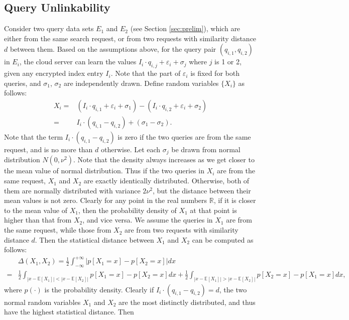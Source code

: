 \documentclass{article}
\begin{document}
\subsection{Query Unlinkability}
Consider two query data sets $E_1$ and $E_2$ (see Section \ref{sec:prelim}), which are either from the same search request, or from two requests with similarity distance $d$ between them. Based on the assumptions above, for the query pair $(q_{i,1},q_{i,2})$ in $E_i$, the cloud server can learn the values $I_i\cdot q_{i,j}+\varepsilon_i+\sigma_j$ where $j$ is 1 or 2, given any encrypted index entry $I_i$. Note that the part of $\varepsilon_i$ is fixed for both queries, and $\sigma_1$, $\sigma_2$ are independently drawn. Define random variables $\{X_i\}$ as follows:
$$
\begin{aligned}
X_i = &(I_i\cdot q_{i,1}+\varepsilon_i+\sigma_1) - (I_i\cdot q_{i,2}+\varepsilon_i+\sigma_2)\\
=&I_i\cdot(q_{i,1}-q_{i,2})+(\sigma_1-\sigma_2).
\end{aligned}
$$
Note that the term $I_i\cdot(q_{i,1}-q_{i,2})$ is zero if the two queries are from the same request, and is no more than $d$ otherwise. Let each $\sigma_j$ be drawn from normal distribution $N(0,\nu^2)$. Note that the density always increases as we get closer to the mean value of normal distribution. Thus if the two queries in $X_i$ are from the same request, $X_1$ and $X_2$ are exactly identically distributed. Otherwise, both of them are normally distributed with variance $2\nu^2$, but the distance between their mean values is not zero. Clearly for any point in the real numbers $\mathbb{R}$, if it is closer to the mean value of $X_1$, then the probability density of $X_1$ at that point is higher than that from $X_2$, and vice versa. We assume the queries in $X_1$ are from the same request, while those from $X_2$ are from two requests with similarity distance $d$. Then the statistical distance between $X_1$ and $X_2$ can be computed as follows:
\newcommand{\norm}[1]{| #1 |}
$$\begin{aligned}
&\Delta(X_1, X_2) 
= \frac{1}{2}\int_{-\infty}^{+\infty} \bigg| p[X_1=x] - p[X_2=x] \bigg| dx\\
=& \frac{1}{2}\int_{\norm{x-\mathbb{E}[X_1]} < \norm{x-\mathbb{E}[X_2]}} p[X_1=x] - p[X_2=x]dx 
+\frac{1}{2}\int_{\norm{x-\mathbb{E}[X_1]} > \norm{x-\mathbb{E}[X_2]}} p[X_2=x] - p[X_1=x]dx,
\end{aligned}$$
where $p(\cdot)$ is the probability density. 
Clearly if $I_i\cdot(q_{i,1}-q_{i,2})=d$, the two normal random variables $X_1$ and $X_2$ are the most distinctly distributed, and thus have the highest statistical distance. Then
\end{document}
